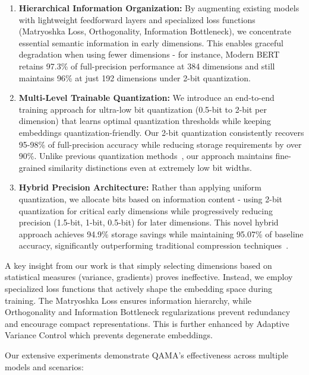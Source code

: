 \begin{enumerate}
    \item \textbf{Hierarchical Information Organization:} By augmenting existing models with lightweight feedforward layers and specialized loss functions (Matryoshka Loss, Orthogonality, Information Bottleneck), we concentrate essential semantic information in early dimensions. This enables graceful degradation when using fewer dimensions - for instance, Modern BERT retains 97.3\% of full-precision performance at 384 dimensions and still maintains 96\% at just 192 dimensions under 2-bit quantization.
    
    \item \textbf{Multi-Level Trainable Quantization:} We introduce an end-to-end training approach for ultra-low bit quantization (0.5-bit to 2-bit per dimension) that learns optimal quantization thresholds while keeping embeddings quantization-friendly. Our 2-bit quantization consistently recovers 95-98\% of full-precision accuracy while reducing storage requirements by over 90\%. Unlike previous quantization methods~\cite{shen2018nash, shu2018compressing}, our approach maintains fine-grained similarity distinctions even at extremely low bit widths.
    
    \item \textbf{Hybrid Precision Architecture:} Rather than applying uniform quantization, we allocate bits based on information content - using 2-bit quantization for critical early dimensions while progressively reducing precision (1.5-bit, 1-bit, 0.5-bit) for later dimensions. This novel hybrid approach achieves 94.9\% storage savings while maintaining 95.07\% of baseline accuracy, significantly outperforming traditional compression techniques~\cite{jaderberg2014speeding, sainath2013low}.
\end{enumerate}

A key insight from our work is that simply selecting dimensions based on statistical measures (variance, gradients) proves ineffective. Instead, we employ specialized loss functions that actively shape the embedding space during training. The Matryoshka Loss ensures information hierarchy, while Orthogonality and Information Bottleneck regularizations prevent redundancy and encourage compact representations. This is further enhanced by Adaptive Variance Control which prevents degenerate embeddings.

Our extensive experiments demonstrate QAMA's effectiveness across multiple models and scenarios:

